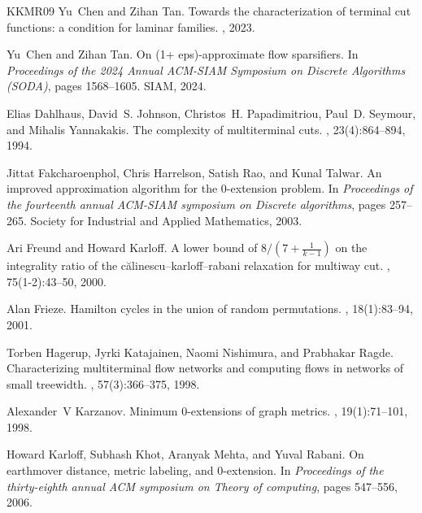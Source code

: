 \documentclass[11pt]{article}
\theoremstyle{definition}
\begin{document}
\begin{titlepage}
\begin{thebibliography}{KKMR09}
Yu~Chen and Zihan Tan.
\newblock Towards the characterization of terminal cut functions: a condition
  for laminar families.
, 2023.

Yu~Chen and Zihan Tan.
\newblock On (1+ eps)-approximate flow sparsifiers.
\newblock In {\em Proceedings of the 2024 Annual ACM-SIAM Symposium on Discrete
  Algorithms (SODA)}, pages 1568--1605. SIAM, 2024.

Elias Dahlhaus, David~S. Johnson, Christos~H. Papadimitriou, Paul~D. Seymour,
  and Mihalis Yannakakis.
\newblock The complexity of multiterminal cuts.
, 23(4):864--894, 1994.

Jittat Fakcharoenphol, Chris Harrelson, Satish Rao, and Kunal Talwar.
\newblock An improved approximation algorithm for the 0-extension problem.
\newblock In {\em Proceedings of the fourteenth annual ACM-SIAM symposium on
  Discrete algorithms}, pages 257--265. Society for Industrial and Applied
  Mathematics, 2003.

Ari Freund and Howard Karloff.
\newblock A lower bound of {$8/(7+ \frac{1}{k-1})$} on the integrality ratio of
  the c{\u{a}}linescu--karloff--rabani relaxation for multiway cut.
, 75(1-2):43--50, 2000.

Alan Frieze.
\newblock Hamilton cycles in the union of random permutations.
, 18(1):83--94, 2001.

Torben Hagerup, Jyrki Katajainen, Naomi Nishimura, and Prabhakar Ragde.
\newblock Characterizing multiterminal flow networks and computing flows in
  networks of small treewidth.
, 57(3):366--375, 1998.

Alexander~V Karzanov.
\newblock Minimum 0-extensions of graph metrics.
, 19(1):71--101, 1998.

Howard Karloff, Subhash Khot, Aranyak Mehta, and Yuval Rabani.
\newblock On earthmover distance, metric labeling, and 0-extension.
\newblock In {\em Proceedings of the thirty-eighth annual ACM symposium on
  Theory of computing}, pages 547--556, 2006.


\end{thebibliography}
\end{titlepage}
\end{document}
